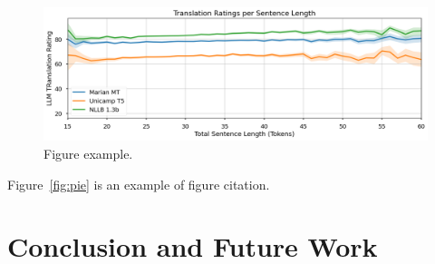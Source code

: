 \documentclass{article}
\begin{document}
\begin{figure}[htpb]
    \centering
    \includegraphics[width=1\textwidth]{figures/line-chart.png}
    \caption{\label{fig:line-chart}Figure example.}
\end{figure}

Figure~\ref{fig:pie} is an example of figure citation.

\section{Conclusion and Future Work}



\end{document}
